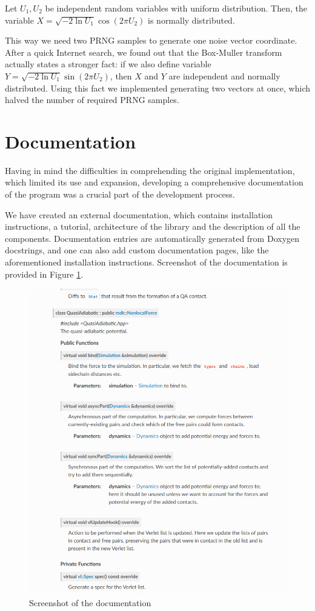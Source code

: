 Let $U_1, U_2$ be independent random variables with uniform distribution. Then, the variable $X = \sqrt{-2\ln{U_1}}\cos(2\pi U_2)$ is normally distributed.

This way we need two PRNG samples to generate one noise vector coordinate. After a quick Internet search, we found out that the Box-Muller transform actually states a stronger fact: if we also define variable $Y = \sqrt{-2\ln{U_1}}\sin(2\pi U_2)$, then $X$ and $Y$ are independent and normally distributed. Using this fact we implemented generating two vectors at once, which halved the number of required PRNG samples.

\section{Documentation}\label{new:docs}
Having in mind the difficulties in comprehending the original implementation, which limited its use and expansion, developing a comprehensive documentation of the program was a crucial part of the development process.

We have created an external documentation, which contains installation instructions, a tutorial, architecture of the library and the description of all the components. Documentation entries are automatically generated from Doxygen docstrings, and one can also add custom documentation pages, like the aforementioned installation instructions. Screenshot of the documentation is provided in Figure \ref{fig:docs}.

\begin{figure}
    \centering
    \includegraphics[width = \textwidth]{graphics/docs2.png}
    \caption{Screenshot of the documentation}
    \label{fig:docs}
\end{figure}

